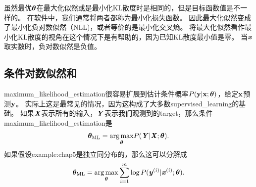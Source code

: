 虽然最优$\boldsymbol{\theta}$在最大化似然或是最小化KL散度时是相同的，但是目标函数值是不一样的。
在软件中，我们通常将两者都称为最小化损失函数。
因此最大化似然变成了最小化负对数似然（NLL)，或者等价的是最小化交叉熵。
将最大化似然看作最小化KL散度的视角在这个情况下是有帮助的，因为已知KL散度最小值是零。
当$\boldsymbol{\mathit{x}}$取实数时，负对数似然是负值。

\subsection{条件对数似然和}
\label{sec:conditional_log_likelihood_and_mean_squared_error}
\gls{maximum_likelihood_estimation}很容易扩展到估计条件概率$P(\mathbf{y}|\mathbf{x};\boldsymbol{\theta})$，给定$\mathbf{x}$预测$\mathbf{y}$。
实际上这是最常见的情况，因为这构成了大多数\gls{supervised_learning}的基础。
如果$\boldsymbol{\mathit{X}}$表示所有的输入，$\boldsymbol{\mathit{Y}}$表示我们观测到的\gls{target}，那么条件\gls{maximum_likelihood_estimation}是
\begin{equation}
    \boldsymbol{\theta}_{\text{ML}} = \underset{\boldsymbol{\theta}}{\arg\max} P(\boldsymbol{\mathit{Y}} | \boldsymbol{\mathit{X}}; \boldsymbol{\theta}).
\end{equation}
如果假设\gls{example:chap5}是独立同分布的，那么这可以分解成
\begin{equation}
\label{eq:5.63}
    \boldsymbol{\theta}_{\text{ML}} = \underset{\boldsymbol{\theta}}{\arg\max} \sum_{i=1}^m \log P(\boldsymbol{\mathit{y}}^{(i)} | \boldsymbol{\mathit{x}}^{(i)}; \boldsymbol{\theta}).
\end{equation}


